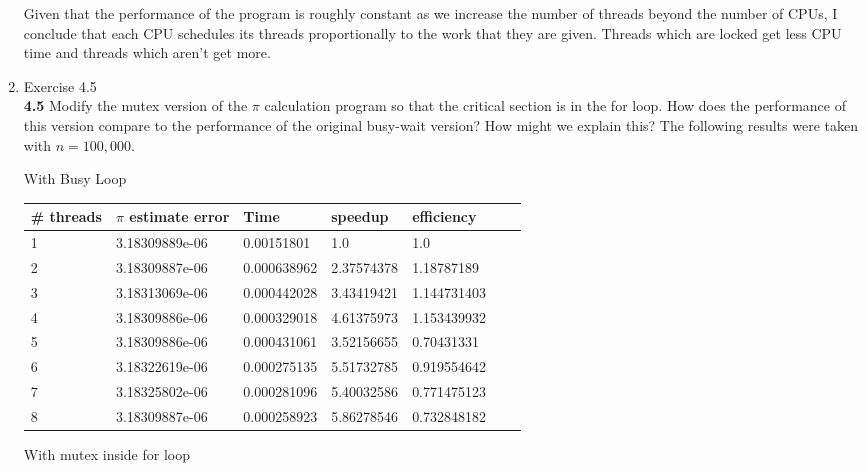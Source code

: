\documentclass[11pt,epsfig,letterpaper]{article}
\begin{document}
\begin{enumerate}
            \quad Given that the performance of the program is roughly constant as we increase the number of threads beyond the number of CPUs, I conclude that each CPU schedules its threads proportionally to the work that they are given. Threads which are locked get less CPU time and threads which aren't get more.

            \item Exercise 4.5 \\
            {\bf 4.5}\>\> Modify the mutex version of the $\pi$ calculation program so that the critical section is in the for loop. How does the performance of this version compare to the performance of the original busy-wait version? How might we explain this?
            \vspace{0.5pc}
            \quad The following results were taken with $n = 100,000$.

            \begin{center}

            With Busy Loop

            \begin{tabular}{ | l | l | l | l | l | l | p{10cm} |}
            \hline
            \# threads & $\pi$ estimate error & Time & speedup & efficiency \\ \hline
            1 &   3.18309889e-06 & 0.00151801     & 1.0        & 1.0       \\ \hline
            2 &   3.18309887e-06 & 0.000638962   &  2.37574378 &1.18787189  \\ \hline
            3 &   3.18313069e-06 & 0.000442028   &  3.43419421 &1.144731403  \\ \hline
            4 &   3.18309886e-06 & 0.000329018   &  4.61375973 &1.153439932  \\ \hline
            5 &   3.18309886e-06 & 0.000431061   &  3.52156655 &0.70431331   \\ \hline
            6 &   3.18322619e-06 & 0.000275135    & 5.51732785 &0.919554642  \\ \hline
            7 &   3.18325802e-06   & 0.000281096 &  5.40032586 &0.771475123  \\ \hline
            8 &   3.18309887e-06  & 0.000258923  &  5.86278546 &0.732848182  \\ \hline
            \end{tabular}
            \vspace{0.5pc}

              \pagebreak
            With mutex inside for loop


\end{center}
\end{enumerate}
\end{document}
